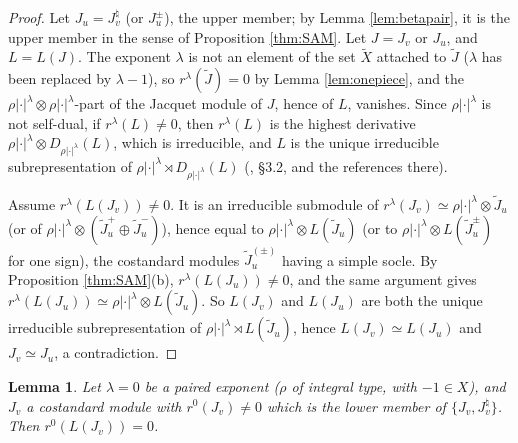 \documentclass[a4paper,12pt,leqno]{amsart}
\theoremstyle{plain}
\newtheorem{lemma}[thm]{Lemma}
\theoremstyle{definition}
\begin{document}
\begin{proof}
Let $J_u=J_v^\natural$ (or $J_u^\pm$), the upper member; by Lemma \ref{lem:betapair}, it is the upper member in the sense of Proposition \ref{thm:SAM}. Let $J=J_v$ or
$J_u$, and $L=L(J)$. The exponent $\lambda$ is not an element of the set
$\widetilde X$ attached to $\widetilde J$ ($\lambda$ has been replaced by $\lambda-1$), so
$r^\lambda(\widetilde J)=0$ by Lemma \ref{lem:onepiece}, and the
$\rho|\cdot|^\lambda\otimes\rho|\cdot|^\lambda$-part of the Jacquet module of $J$, hence of $L$,
vanishes. Since $\rho|\cdot|^\lambda$ is not self-dual, if $r^\lambda(L)\neq0$, then $r^\lambda(L)$ is
the highest derivative $\rho|\cdot|^\lambda\otimes D_{\rho|\cdot|^\lambda}(L)$, which is
irreducible, and $L$ is the unique irreducible subrepresentation of $\rho|\cdot|^\lambda\rtimes
D_{\rho|\cdot|^\lambda}(L)$ (\cite{AM23}, \S3.2, and the references there).

Assume $r^\lambda(L(J_v))\neq0$. It is an irreducible submodule of $r^\lambda(J_v)\simeq
\rho|\cdot|^\lambda\otimes\widetilde J_u$ (or of $\rho|\cdot|^\lambda\otimes(\widetilde J_u^+\oplus
\widetilde J_u^-)$), hence equal to $\rho|\cdot|^\lambda\otimes L(\widetilde J_u)$ (or to
$\rho|\cdot|^\lambda\otimes L(\widetilde J_u^\pm)$ for one sign), the costandard modules
$\widetilde J_u^{(\pm)}$ having a simple socle. By Proposition \ref{thm:SAM}(b), $r^\lambda(L(J_u))\neq0$,
and the same argument gives $r^\lambda(L(J_u))\simeq\rho|\cdot|^\lambda\otimes L(\widetilde J_u)$. So
$L(J_v)$ and $L(J_u)$ are both the unique irreducible subrepresentation of
$\rho|\cdot|^\lambda\rtimes L(\widetilde J_u)$, hence $L(J_v)\simeq L(J_u)$ and $J_v\simeq J_u$, a
contradiction.
\end{proof}

\begin{lemma}\label{lem:lowersocle0} Let $\lambda=0$ be a paired exponent ($\rho$ of integral type, with $-1\in X$),
and $J_v$ a costandard module with $r^0(J_v)\neq0$ which is the lower member of $\{J_v,J_v^\natural\}$.
Then $r^0(L(J_v))=0$.
\end{lemma}
\end{document}
